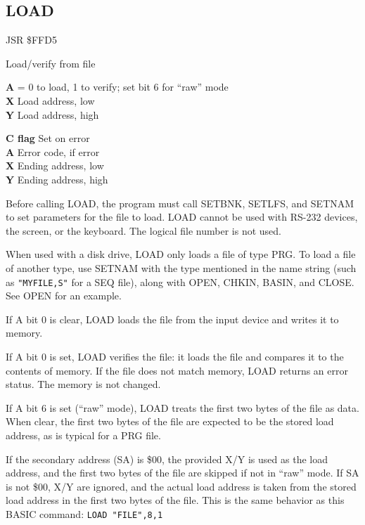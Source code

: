 \subsection{LOAD}
\label{KERNAL Jump Table!LOAD}
\begin{description}[leftmargin=2cm,style=nextline]
    \item [Address:] JSR \$FFD5
    \item [Description:] Load/verify from file
    \item [Inputs:]
        \textbf{A} = 0 to load, 1 to verify; set bit 6 for ``raw'' mode \\
        \textbf{X} Load address, low \\
        \textbf{Y} Load address, high
    \item [Outputs:]
        \textbf{C flag} Set on error \\
        \textbf{A} Error code, if error \\
        \textbf{X} Ending address, low \\
        \textbf{Y} Ending address, high
    \item [Remarks:]
        Before calling LOAD, the program must call SETBNK, SETLFS, and SETNAM to set parameters for the file to load. LOAD cannot be used with RS-232 devices, the screen, or the keyboard. The logical file number is not used.

        When used with a disk drive, LOAD only loads a file of type PRG. To load a file of another type, use SETNAM with the type mentioned in the name string (such as \texttt{"MYFILE,S"} for a SEQ file), along with OPEN, CHKIN, BASIN, and CLOSE. See OPEN for an example.

        If A bit 0 is clear, LOAD loads the file from the input device and writes it to memory.

        If A bit 0 is set, LOAD verifies the file: it loads the file and compares it to the contents of memory. If the file does not match memory, LOAD returns an error status. The memory is not changed.

        If A bit 6 is set (``raw'' mode), LOAD treats the first two bytes of the file as data. When clear, the first two bytes of the file are expected to be the stored load address, as is typical for a PRG file.

        If the secondary address (SA) is \$00, the provided X/Y is used as the load address, and the first two bytes of the file are skipped if not in ``raw'' mode. If SA is not \$00, X/Y are ignored, and the actual load address is taken from the stored load address in the first two bytes of the file. This is the same behavior as this BASIC command: \texttt{LOAD "FILE",8,1}


\end{description}
